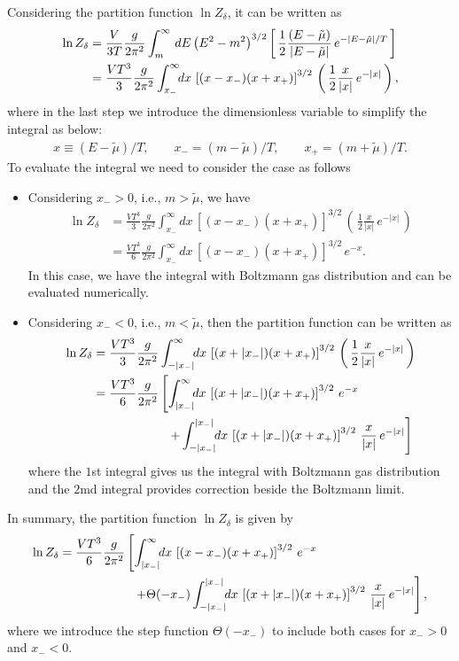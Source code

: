 \documentclass[sn-mathphys,Numbered]{sn-jnl}
\theoremstyle{thmstyleone}%
\theoremstyle{thmstyletwo}%
\theoremstyle{thmstylethree}%
\begin{document}
Considering the partition function $\ln{Z}_\delta$, it can be written as
\begin{align}
\label{Integral001}
\ln{Z}_\delta&=\frac{V}{3T}\frac{g}{2\pi^2}\int^\infty_m\,dE\left(E^2-m^2\right)^{3/2} \left[\,\frac{1}{2}\frac{(E-\tilde\mu)}{|E-\tilde\mu|}\,e^{-|E-\tilde\mu|/T}\,\right]\notag\\
&=\frac{VT^3}{3}\frac{g}{2\pi^2}\int^\infty_{x_-}\!\!dx\,\left[(x-x_-)(x+x_+)\right]^{3/2}\,\left(\,\frac{1}{2}\frac{x}{|x|}\,e^{-|x|}\,\right),
\end{align}
where in the last step we introduce the dimensionless variable to simplify the integral as below:
\begin{align}\label{Dimensionless}
x\equiv\left({E-\tilde\mu}\right)/T,\qquad x_-=(m-\tilde\mu)/T,\qquad x_+=(m+\tilde\mu)/T.
\end{align}
To evaluate the integral we need to consider the case as follows
\begin{itemize}
  \item Considering $x_->0$, i.e., $m>\tilde\mu$, we have
  \begin{align}
  \ln{Z}_\delta&=\frac{VT^3}{3}\frac{g}{2\pi^2}\int^\infty_{x_-}\!\!dx\,\left[(x-x_-)(x+x_+)\right]^{3/2}\,\left(\,\frac{1}{2}\frac{x}{|x|}\,e^{-|x|}\,\right)\\
  &=\frac{VT^3}{6}\frac{g}{2\pi^2}\int^\infty_{x_-}\!\!dx\,\left[(x-x_-)(x+x_+)\right]^{3/2}\,e^{-x}.
  \end{align}
  In this case, we have the integral with Boltzmann gas distribution and can be evaluated numerically. 
  \item Considering $x_-<0$, i.e., $m<\tilde\mu$, then the partition function can be written as
  \begin{align}
   \ln{Z}_\delta&=\frac{VT^3}{3}\frac{g}{2\pi^2}\int^\infty_{-|x_-|}\!\!dx\,\left[(x+|x_-|)(x+x_+)\right]^{3/2}\,\left(\,\frac{1}{2}\frac{x}{|x|}\,e^{-|x|}\,\right)\\
   &=\frac{VT^3}{6}\frac{g}{2\pi^2}\left[\int^\infty_{|x_-|}\!\!dx\,\left[(x+|x_-|)(x+x_+)\right]^{3/2}\,e^{-x}\right.\notag\\
   &\qquad\qquad\qquad\left.+\int^{|x_-|}_{-|x_-|}\!\!dx\,\left[(x+|x_-|)(x+x_+)\right]^{3/2}\,\frac{x}{|x|}\,e^{-|x|}\right]
  \end{align}
  where the $1$st integral gives us the integral with Boltzmann gas distribution and the $2$md integral provides correction beside the Boltzmann limit.
\end{itemize}
In summary, the partition function $\ln{Z}_\delta$ is given by
\begin{align}
\ln{Z}_\delta&=\frac{VT^3}{6}\frac{g}{2\pi^2}\left[\int^\infty_{|x_-|}\!\!dx\,\left[(x-x_-)(x+x_+)\right]^{3/2}\,e^{-x}\right.\notag\\
   &\qquad\qquad\qquad\left.+\Theta(-x_-)\int^{|x_-|}_{-|x_-|}\!\!dx\,\left[(x+|x_-|)(x+x_+)\right]^{3/2}\,\frac{x}{|x|}\,e^{-|x|}\right],
\end{align}
where we introduce the step function $\Theta(-x_-)$ to include both cases for $x_->0$ and $x_-<0$.
\end{document}

